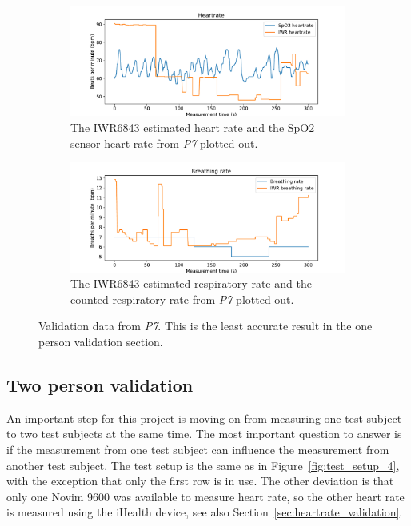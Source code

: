 \begin{figure}[t]
\begin{subfigure}{\textwidth}
  \centering
  \includegraphics[width=\linewidth]{figures/validation/tim_heart.pdf}  
  \caption{The IWR6843 estimated heart rate and the SpO2 sensor heart rate from \emph{P7} plotted out.}
  \label{fig:tim_heart}
\end{subfigure}
\begin{subfigure}{\textwidth}
  \centering
  \includegraphics[width=\linewidth]{figures/validation/tim_breath.pdf}  
  \caption{The IWR6843 estimated respiratory rate and the counted respiratory rate from \emph{P7} plotted out.}
  \label{fig:tim_breath}
\end{subfigure}
\caption{Validation data from \emph{P7}. This is the least accurate result in the one person validation section.}
\label{fig:tim_meas}
\end{figure}

\subsection{Two person validation}
An important step for this project is moving on from measuring one test subject to two test subjects at the same time. The most important question to answer is if the measurement from one test subject can influence the measurement from another test subject. The test setup is the same as in Figure~\ref{fig:test_setup_4}, with the exception that only the first row is in use. The other deviation is that only one Novim 9600 was available to measure heart rate, so the other heart rate is measured using the iHealth device, see also Section~\ref{sec:heartrate_validation}.

